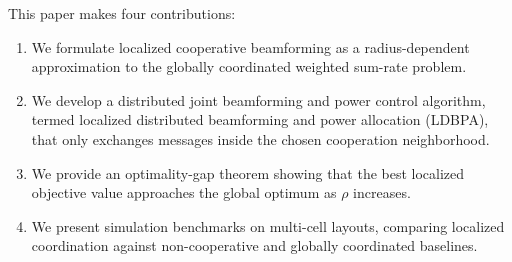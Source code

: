 This paper makes four contributions:
\begin{enumerate}
  \item We formulate localized cooperative beamforming as a radius-dependent approximation to the globally coordinated weighted sum-rate problem.
  \item We develop a distributed joint beamforming and power control algorithm, termed localized distributed beamforming and power allocation (LDBPA), that only exchanges messages inside the chosen cooperation neighborhood.
  \item We provide an optimality-gap theorem showing that the best localized objective value approaches the global optimum as $\rho$ increases.
  \item We present simulation benchmarks on multi-cell layouts, comparing localized coordination against non-cooperative and globally coordinated baselines.
\end{enumerate}
